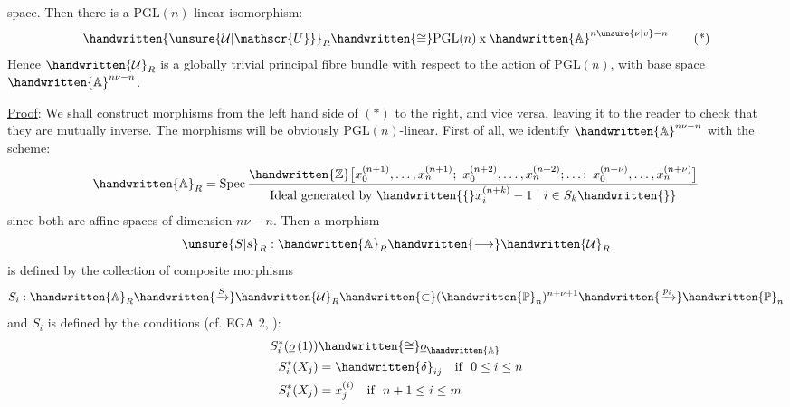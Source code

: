 space. Then there is a $\mathrm{PGL}(n)$-linear isomorphism:
\begingroup\makeatletter\tagsleft@true\makeatother
\[
\handwritten{\unsure{\mathcal{U}|\mathscr{U}}}_R\handwritten{\cong}\mathrm{PGL}(n)\mathbin{\mathrm{x}}
\handwritten{\mathbb{A}}^{n\unsure{\nu|v}-n}\tag*{(*)}
\]
\endgroup
Hence $\handwritten{\mathcal{U}}_R$ is a globally trivial principal fibre bundle with respect
to the action of $\mathrm{PGL}(n)$, with base space $\handwritten{\mathbb{A}}^{n\nu-n}$.

\uline{Proof}: We shall construct morphisms from the left hand side of
$(*)$ to the right, and vice versa, leaving it to the reader to check
that they are mutually inverse. The morphisms will be obviously $\mathrm{PGL}(n)$-linear. First of all, we identify $\handwritten{\mathbb{A}}^{n\nu-n}$ with the scheme:
\[
\handwritten{\mathbb{A}}_R=\operatorname{Spec}
\frac{\handwritten{\mathbb{Z}}\bigl[x_0^{(n+1)},\ldots,x_n^{(n+1)};\ x_0^{(n+2)},\ldots,x_n^{(n+2)};\ldots;\ x_0^{(n+\nu)},\ldots,x_n^{(n+\nu)}\bigr]}
{\text{Ideal generated by }\handwritten{\{}x_i^{(n+k)}-1\mathrel{\big|}i\in S_k\handwritten{\}}}
\]
since both are affine spaces of dimension $n\nu-n$. Then a morphism
\[
\unsure{S|s}_R:\handwritten{\mathbb{A}}_R\handwritten{\longrightarrow}\handwritten{\mathcal{U}}_R
\]
is defined by the collection of composite morphisms
\[
S_i:\handwritten{\mathbb{A}}_R\handwritten{\xrightarrow{S}}\handwritten{\mathcal{U}}_R\handwritten{\subset}
(\handwritten{\mathbb{P}}_n)^{n+\nu+1}\handwritten{\xrightarrow{p_i}}\handwritten{\mathbb{P}}_n
\]
and $S_i$ is defined by the conditions (cf. EGA 2,  ):
\[
\begin{aligned}
 S_i^*(\underline{o}\,(1))&\handwritten{\cong}\underline{o}_{\handwritten{\mathbb{A}}}\\
 S_i^*(X_j)&=\handwritten{\delta}_{ij}\quad\text{if }\ 0\leq i\leq n\\
 S_i^*(X_j)&=x_j^{(i)}\quad\text{if }\ n+1\leq i\leq m
\end{aligned}
\]


